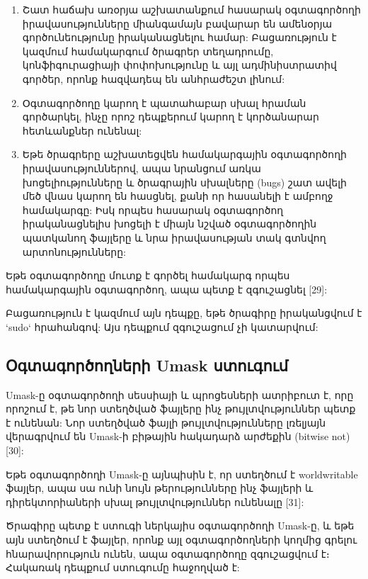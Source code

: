 \documentclass[a4paper,12pt]{article}
\begin{document}
\begin{sloppypar}
\begin{enumerate}
\item Շատ հաճախ առօրյա աշխատանքում հասարակ օգտագործողի իրավասությունները
	միանգամայն բավարար են ամենօրյա գործունեությունը իրականացնելու համար:
	Բացառություն է կազմում համակարգում ծրագրեր տեղադրումը, կոնֆիգուրացիայի
	փոփոխությունը և այլ ադմինիստրատիվ գործեր, որոնք հազվադեպ են անհրաժեշտ
	լինում:
\item Օգտագործողը կարող է պատահաբար սխալ հրաման գործարկել, ինչը որոշ
	դեպքերում կարող է կործանարար հետևանքներ ունենալ:
\item Եթե ծրագրերը աշխատեցվեն համակարգային օգտագործողի իրավասություններով,
	ապա նրանցում առկա խոցելիությունները և ծրագրային սխալները (bugs) շատ
	ավելի մեծ վնաս կարող են հասցնել, քանի որ հասանելի է ամբողջ համակարգը:
	Իսկ որպես հասարակ օգտագործող
	իրականացնելիս խոցելի է միայն նշված օգտագործողին պատկանող ֆայլերը և
	նրա իրավասության տակ գտնվող արտոնությունները:
\end{enumerate}


Եթե օգտագործողը մուտք է գործել համակարգ որպես
համակարգային օգտագործող, ապա պետք է զգուշացնել [29]:

Բացառություն է կազմում այն դեպքը, եթե ծրագիրը իրականցվում է
`sudo` հրահանգով: Այս դեպքում զգուշացում չի կատարվում:


\subsection{Օգտագործողների Umask ստուգում}


Umask-ը օգտագործողի սեսսիայի և պրոցեսների ատրիբուտ է, որը
որոշում է, թե նոր ստեղծված ֆայլերը ինչ թույլտվություններ
պետք է ունենան: Նոր ստեղծված ֆայլի թույլտվությունները
լռելյայն վերագրվում են Umask-ի բիթային հակադարձ արժեքին (bitwise not) [30]:

Եթե օգտագործողի Umask-ը այնպիսին է, որ ստեղծում է
worldwritable ֆայլեր, ապա սա ունի նույն թերությունները
ինչ ֆայլերի և դիրեկտորիաների սխալ թույլտվություններ ունենալը [31]:

Ծրագիրը պետք է ստուգի ներկայիս օգտագործողի Umask-ը, և եթե այն
ստեղծում է ֆայլեր, որոնք այլ օգտագործողների կողմից գրելու
հնարավորություն ունեն, ապա օգտագործողը զգուշացվում է։ Հակառակ
դեպքում ստուգումը հաջողված է:





\end{sloppypar}
\end{document}
